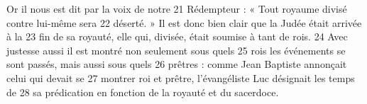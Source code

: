 Or il nous est dit par la voix de notre	 
21	 	Rédempteur : « Tout royaume divisé contre lui-même sera	 
22	 	déserté. » Il est donc bien clair que la Judée était arrivée à la	 
23	 	fin de sa royauté, elle qui, divisée, était soumise à tant de rois.	 
24	 	Avec justesse aussi il est montré non seulement sous quels	 
25	 	rois les événements se sont passés, mais aussi sous quels	 
26	 	prêtres : comme Jean Baptiste annonçait celui qui devait se	 
27	 	montrer roi et prêtre, l'évangéliste Luc désignait les temps de	 
28	 	sa prédication en fonction de la royauté et du sacerdoce.